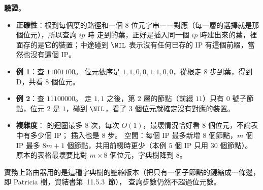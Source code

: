 \begin{pastsoln}
\textbf{驗證}。
\begin{itemize}
\item \textbf{正確性}：根到每個葉的路徑和一個 $8$ 位元字串一一對應（每一層的選擇就是那個位元），所以查詢 $\mathit{ip}$ 時
走到的葉，正好是插入同一個 $\mathit{ip}$ 時建出來的葉，裡面存的是它的裝置；中途碰到 $\NIL$ 表示沒有任何已存的 IP
有這個前綴，當然也沒有這個 IP。
\item \textbf{例 1}：查 $11001100$。 位元依序是 $1,1,0,0,1,1,0,0$，從根走 $8$ 步到葉，得到 D，共看 $8$ 個位元。
\item \textbf{例 2}：查 $11100000$。 走 $1, 1$ 之後，第 $2$ 層的節點（前綴 $11$）只有 0 號子節點，位元 2 是 $1$，碰到
$\NIL$，看了 $3$ 個位元就確定沒有對應的裝置。
\item \textbf{複雜度}： 的迴圈最多 $8$ 次，每次 $O(1)$，最壞情況恰好看 $8$ 個位元，不論表中有多少個 IP；
插入也是 $8$ 步。 空間：每個 IP 最多新增 $8$ 個節點，$m$ 個 IP 最多 $8m + 1$ 個節點，共用前綴時更少（本例 $5$ 個 IP 只用
$30$ 個節點）。 原本的表格最壞要比對 $m \times 8$ 個位元，字典樹降到 $8$。
\end{itemize}
實務上路由器用的是這種字典樹的壓縮版本（把只有一個子節點的鏈縮成一條邊，即 Patricia 樹，資結書第~11.5.3~節），
查詢步數仍然不超過位元數。
\end{pastsoln}
